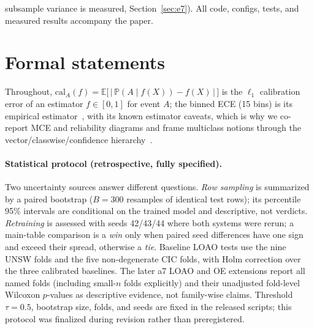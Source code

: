 \documentclass[sigconf,anonymous=false]{acmart}
\begin{document}
subsample variance is measured, Section~\ref{sec:e7}). All code, configs, tests, and measured results accompany the paper.

\appendix
\section{Formal statements}
\label{app:formal}

Throughout, $\mathrm{cal}_A(f) = \mathbb{E}\big[\,|\,\mathbb{P}(A \mid f(X)) - f(X)\,|\,\big]$ is the $\ell_1$ calibration error of an estimator $f\in[0,1]$ for event $A$; the binned ECE (15 bins) is its empirical estimator~\cite{kumar2019}, with its known estimator caveats, which is why we co-report MCE and reliability diagrams and frame multiclass notions through the vector/classwise/confidence hierarchy~\cite{vaicenavicius2019}.

\paragraph{Statistical protocol (retrospective, fully specified).} Two uncertainty sources answer different questions. \emph{Row sampling} is summarized by a paired bootstrap ($B{=}300$ resamples of identical test rows); its percentile 95\% intervals are conditional on the trained model and descriptive, not verdicts. \emph{Retraining} is assessed with seeds 42/43/44 where both systems were rerun; a main-table comparison is a \emph{win} only when paired seed differences have one sign and exceed their spread, otherwise a \emph{tie}. Baseline LOAO tests use the nine UNSW folds and the five non-degenerate CIC folds, with Holm correction over the three calibrated baselines. The later a7 LOAO and OE extensions report all named folds (including small-$n$ folds explicitly) and their unadjusted fold-level Wilcoxon $p$-values as descriptive evidence, not family-wise claims. Threshold $\tau{=}0.5$, bootstrap size, folds, and seeds are fixed in the released scripts; this protocol was finalized during revision rather than preregistered.
\end{document}
